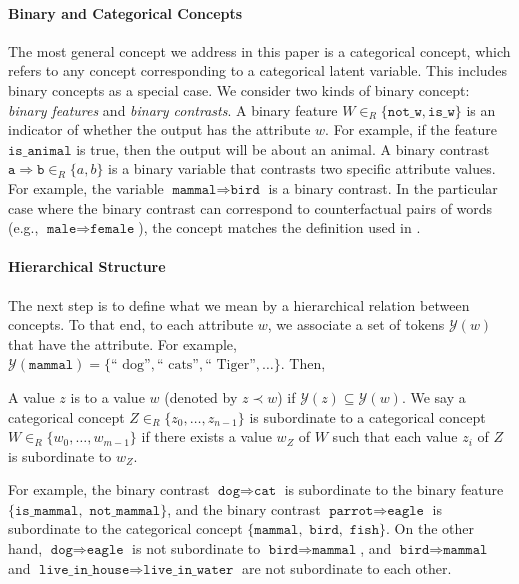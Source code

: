 \documentclass{article}
\newcommand{\ConceptName}[1]{$\mathtt{#1}$}
\newcommand{\ConceptValue}[1]{\texttt{#1}}
\newcommand{\ConceptDirName}[2]{\texttt{#1}\Rightarrow\texttt{#2}}
\newcommand{\yquad}{\mathcal{Y}}
\begin{document}
\paragraph{Binary and Categorical Concepts}
The most general concept we address in this paper is a categorical concept, which refers to any concept corresponding to a categorical latent variable.
This includes binary concepts as a special case. 
We consider two kinds of binary concept: \emph{binary features} and \emph{binary contrasts}.
A binary feature $W \in_R \{\ConceptValue{not\_w}, \ConceptValue{is\_w}\}$ is an indicator of whether the output has the attribute $w$. For example, if the feature \ConceptName{is\_animal} is true, then the output will be about an animal.
A binary contrast $\ConceptDirName{a}{b} \in_R \{a, b \}$ is a binary variable that contrasts two specific attribute values. For example, the variable $\ConceptDirName{mammal}{bird}$ is a binary contrast.
In the particular case where the binary contrast can correspond to counterfactual pairs of words (e.g., $\ConceptDirName{male}{female}$), the concept matches the definition used in \citet{park2024linear}.


\paragraph{Hierarchical Structure}
The next step is to define what we mean by a hierarchical relation between concepts.
To that end, to each attribute $w$, we associate a set of tokens $\yquad(w)$ that have the attribute.
For example, $\yquad(\ConceptValue{mammal}) = \{\text{`` dog''}, \text{`` cats''}, \text{`` Tiger''}, \dots\}$.
Then,
\begin{definition}\label{def:hierarchical_relation}
  A value $z$ is  to a value $w$ (denoted by $z \prec w$) if $\yquad(z) \subseteq \yquad(w)$.
  We say a categorical concept $Z \in_R \{z_0, \dots, z_{n-1}\}$ is subordinate to a categorical concept $W \in_R \{w_0, \dots, w_{m-1}\}$ if there exists a value $w_Z$ of $W$ such that each value $z_i$ of $Z$ is subordinate to $w_Z$.
\end{definition}

For example, the binary contrast  $\ConceptDirName{dog}{cat}$ is subordinate to the binary feature $\{\ConceptValue{is\_mammal},$ $\ConceptValue{not\_mammal}\}$, and the binary contrast $\ConceptDirName{parrot}{eagle}$ is subordinate to the categorical concept $\{\ConceptValue{mammal},$ $\ConceptValue{bird},$ $\ConceptValue{fish}\}$.
On the other hand, $\ConceptDirName{dog}{eagle}$ is not subordinate to $\ConceptDirName{bird}{mammal}$, and $\ConceptDirName{bird}{mammal}$ and $\ConceptDirName{live\_in\_house}{live\_in\_water}$ are not subordinate to each other.
\end{document}
